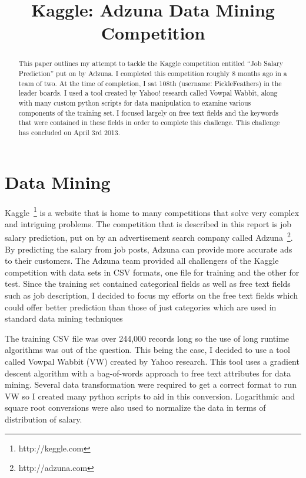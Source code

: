 \documentclass[conference]{IEEEtran}
\begin{document}
\title{Kaggle: Adzuna Data Mining Competition}

\author{
}

\maketitle


\begin{abstract}
This paper outlines my attempt to tackle the Kaggle competition entitled ``Job Salary Prediction''
put on by Adzuna. I completed this competition roughly 8 months ago in a team of two. At the time
of completion, I sat 108th (username: PickleFeathers) in the leader boards. I used a tool created by Yahoo! research called Vowpal
Wabbit, along with many custom python scripts for data manipulation to examine various components
of the training set. I focused largely on free text fields and the keywords that were contained in 
these fields in order to complete this challenge. This challenge has concluded on April 3rd 2013.

\end{abstract}


\section{Data Mining}

Kaggle~\footnote{http://keggle.com} is a website that is home to many competitions that solve very complex and intriguing problems. 
The competition that is  described in this report is job salary prediction, put on by an advertisement search company called 
Adzuna~\footnote{http://adzuna.com}. By predicting the salary from job posts, Adzuna can provide more accurate ads to their customers. 
The Adzuna team provided all challengers of the Kaggle competition with data sets in CSV formats, one file for training and the other 
for test. Since the training set contained categorical fields as well as free text fields such as job description, I decided to focus 
my efforts on the free text fields which could offer better prediction than those of just categories which are used in standard data 
mining techniques

The training CSV file was over 244,000 records long so the use of long runtime algorithms was out of the question. This being the case,
I decided to use a tool called Vowpal Wabbit (VW) created by Yahoo research. This tool uses a gradient descent
algorithm with a bag-of-words approach to free text attributes for data mining. Several data transformation were required to get
a correct format to run VW so I created many python scripts to aid in this conversion. Logarithmic and square root conversions were
also used to normalize the data in terms of distribution of salary.
\end{document}
